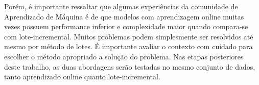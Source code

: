 Porém, é importante ressaltar que algumas experiências da comunidade de Aprendizado de Máquina é de que modelos com aprendizagem online muitas vezes possuem performance inferior e complexidade maior quando compara-se com lote-incremental. Muitos problemas podem simplesmente ser resolvidos até mesmo por método de lotes. É importante avaliar o contexto com cuidado para escolher o método apropriado a solução do problema. Nas etapas posteriores deste trabalho, as duas abordagens serão testadas no mesmo conjunto de dados, tanto aprendizado online quanto lote-incremental.




 

